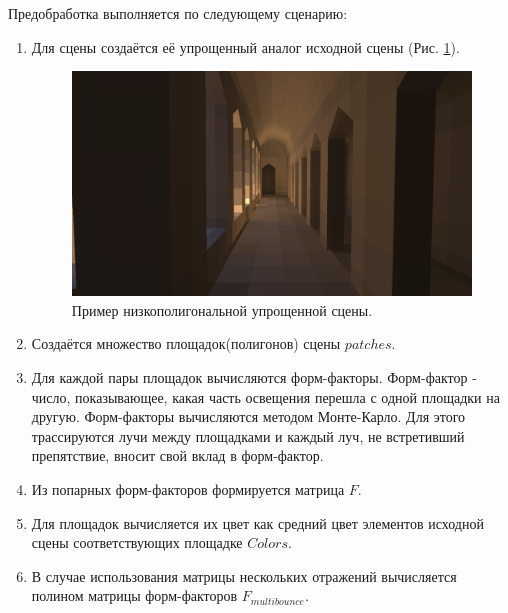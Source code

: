 \documentclass[oneside,final,12pt, a4paper]{extreport}
\begin{document}
Предобработка выполняется по следующему сценарию:
\begin{enumerate}
	\item Для сцены создаётся её упрощенный аналог исходной сцены (Рис. \ref{fig:Simplified}).
\begin{figure}[htb]
  \begin{center}
  \includegraphics[width=\linewidth]{img/Simplified.png}
  \caption{Пример низкополигональной упрощенной сцены.}
  \label{fig:Simplified}
  \end{center}
\end{figure}
	
	\item Создаётся множество площадок(полигонов) сцены $patches$.
	\item Для каждой пары площадок вычисляются форм-факторы. Форм-фактор - число, показывающее, какая часть освещения перешла с одной площадки на другую. Форм-факторы вычисляются методом Монте-Карло. Для этого трассируются лучи между площадками и каждый луч, не встретивший препятствие, вносит свой вклад в форм-фактор.
	\item Из попарных форм-факторов формируется матрица $F$.
	\item Для площадок вычисляется их цвет как средний цвет элементов исходной сцены соответствующих площадке $Colors$.
	\item В случае использования матрицы нескольких отражений вычисляется полином матрицы форм-факторов $F_{multibounce}$.
\end{enumerate}
\end{document}
